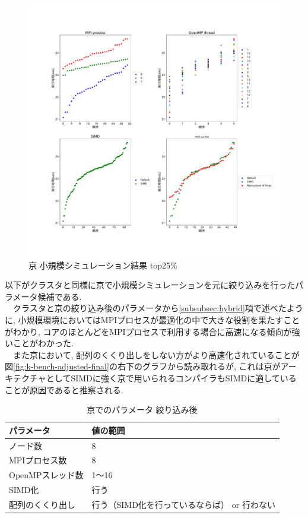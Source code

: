 \begin{figure}[htb]
\begin{center}
    \includegraphics[width=14cm]{./images/k-bench-top25.pdf}
    \caption{京 小規模シミュレーション結果 top25\%}
    \label{fig:k-bench-top25}
\end{center}
\end{figure}

以下がクラスタと同様に京で小規模シミュレーションを元に絞り込みを行ったパラメータ候補である.\\
　クラスタと京の絞り込み後のパラメータから\ref{subsubsec:hybrid}項で述べたように,
小規模環境においてはMPIプロセスが最適化の中で大きな役割を果たすことがわかり,
コアのほとんどをMPIプロセスで利用する場合に高速になる傾向が強いことがわかった.\\
　また京において, 配列のくくり出しをしない方がより高速化されていることが図\ref{fig:k-bench-adjusted-final}の右下のグラフから読み取れるが,
これは京がアーキテクチャとしてSIMDに強く京で用いられるコンパイラもSIMDに適していることが原因であると推察される.
\begin{table}[htb]
  \caption {京でのパラメータ 絞り込み後}
  \begin{center}
    \begin{tabular}{|p{6cm}|p{8cm}|}
      \hline
      パラメータ & 値の範囲\\ \hline
      ノード数 & 8\\ \hline
      MPIプロセス数 & 8\\ \hline
      OpenMPスレッド数 & 1〜16\\ \hline
      SIMD化 & 行う\\ \hline
      配列のくくり出し & 行う（SIMD化を行っているならば） or 行わない\\ \hline
    \end{tabular}
  \end{center}
\end{table}

